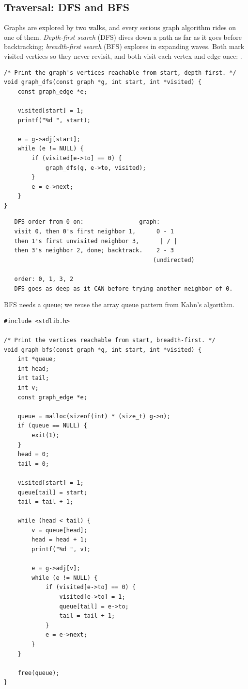 \subsection{Traversal: DFS and BFS}

Graphs are explored by two walks, and every serious graph algorithm
rides on one of them. \emph{Depth-first search} (DFS) dives down a
path as far as it goes before backtracking; \emph{breadth-first search}
(BFS) explores in expanding waves. Both mark visited vertices so they
never revisit, and both visit each vertex and edge once:
.

\begin{lstlisting}[caption={DFS, written with an explicit recursion.}]
/* Print the graph's vertices reachable from start, depth-first. */
void graph_dfs(const graph *g, int start, int *visited) {
    const graph_edge *e;

    visited[start] = 1;
    printf("%d ", start);

    e = g->adj[start];
    while (e != NULL) {
        if (visited[e->to] == 0) {
            graph_dfs(g, e->to, visited);
        }
        e = e->next;
    }
}
\end{lstlisting}

\begin{verbatim}
   DFS order from 0 on:                graph:
   visit 0, then 0's first neighbor 1,      0 - 1
   then 1's first unvisited neighbor 3,      | / |
   then 3's neighbor 2, done; backtrack.    2 - 3
                                           (undirected)

   order: 0, 1, 3, 2
   DFS goes as deep as it CAN before trying another neighbor of 0.
\end{verbatim}

BFS needs a queue; we reuse the array queue pattern from Kahn's
algorithm.

\begin{lstlisting}[caption={BFS, exploring in waves with a queue.}]
#include <stdlib.h>

/* Print the vertices reachable from start, breadth-first. */
void graph_bfs(const graph *g, int start, int *visited) {
    int *queue;
    int head;
    int tail;
    int v;
    const graph_edge *e;

    queue = malloc(sizeof(int) * (size_t) g->n);
    if (queue == NULL) {
        exit(1);
    }
    head = 0;
    tail = 0;

    visited[start] = 1;
    queue[tail] = start;
    tail = tail + 1;

    while (head < tail) {
        v = queue[head];
        head = head + 1;
        printf("%d ", v);

        e = g->adj[v];
        while (e != NULL) {
            if (visited[e->to] == 0) {
                visited[e->to] = 1;
                queue[tail] = e->to;
                tail = tail + 1;
            }
            e = e->next;
        }
    }

    free(queue);
}
\end{lstlisting}


